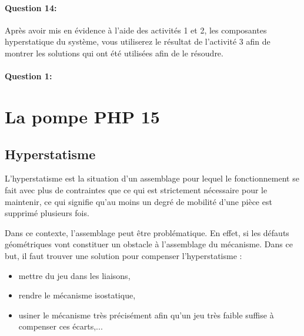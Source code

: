 \paragraph{Question 14:} Après avoir mis en évidence à l'aide des activités 1 et 2, les composantes hyperstatique du système, vous utiliserez le résultat de l'activité 3 afin de montrer les solutions qui ont été utilisées afin de le résoudre.



\pagestyle{correction}\setcounter{section}{0}

\paragraph{Question 1:}



























\section{La pompe PHP 15}

\subsection{Hyperstatisme}

L'hyperstatisme est la situation d'un assemblage pour lequel le fonctionnement se fait avec plus de contraintes que ce qui est strictement nécessaire pour le maintenir, ce qui signifie qu'au moins un degré de mobilité d'une pièce est supprimé plusieurs fois.

Dans ce contexte, l'assemblage peut être problématique. En effet, si les défauts géométriques vont constituer un obstacle à l'assemblage du mécanisme. Dans ce but, il faut trouver une solution pour compenser l'hyperstatisme :
\begin{itemize}
 \item mettre du jeu dans les liaisons,
 \item rendre le mécanisme isostatique,
 \item usiner le mécanisme très précisément afin qu'un jeu très faible suffise à compenser ces écarts,...
\end{itemize}

